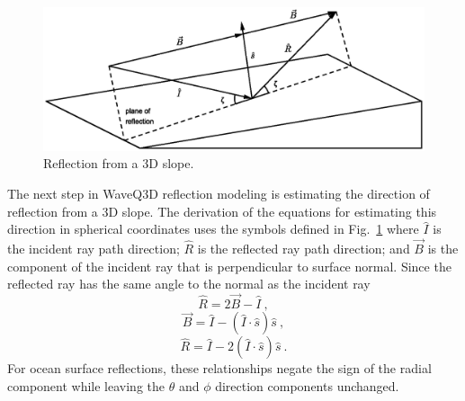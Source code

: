 \documentclass{ws-jca}
\newcommand{\threeD}{3\nobreakdash\textendash D }	%
\begin{document}
\begin{figure}[th]
	\centerline{\includegraphics[width=5in]{EstDirectionCollision.eps}} 
	\vspace*{8pt}
	\caption{Reflection from a \threeD slope.}
	\label{fig:reflect3d}
\end{figure}
The next step in WaveQ3D reflection modeling is estimating the direction of
reflection from a \threeD slope. The derivation of the equations for
estimating this direction in spherical coordinates uses the
symbols defined in Fig.~\ref{fig:reflect3d} 
where
\(\hat{I}\) is the incident ray path direction;
\(\hat{R}\) is the reflected ray path direction; and
\(\vec{B}\) is the component of the incident ray that is perpendicular to surface normal.
Since the reflected ray has the same angle to the normal as the incident ray
\begin{equation}
\hat{R} = 2\vec{B} - \hat{I} \:,
\label{eq:reflect_r_hat}
\end{equation}
\begin{equation}
\vec{B} =  \hat{I} - ( \hat{I} \cdot \hat{s} ) \hat{s} \:,
\label{eq:reflect_p_hat}
\end{equation}
\begin{equation}
\hat{R} =  \hat{I} - 2 ( \hat{I} \cdot \hat{s} ) \hat{s} \:.
\label{eq:reflect_direction}
\end{equation}
For ocean surface reflections, these relationships negate the sign of the
radial component while leaving the \(\theta\) and \(\phi\) direction
components unchanged.
\end{document}

